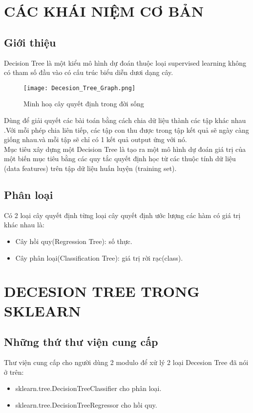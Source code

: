 \documentclass[12pt, a4paper]{article}
\begin{document}
\section{CÁC KHÁI NIỆM CƠ BẢN}
\subsection{Giới thiệu}
Decision Tree là một kiểu mô hình dự đoán thuộc loại supervised learning không có tham số đầu vào có cấu trúc biểu diễn dươi dạng cây.\\
\begin{wrapfigure}{l}[0pt]{0.625\linewidth}
    \texttt{[image: Decesion\_Tree\_Graph.png]}
    \caption{Minh hoạ cây quyết định trong đời sống}
\end{wrapfigure}
Dùng để giải quyết các bài toán bằng cách chia dữ liệu thành các tập khác nhau .Với mỗi phép chia liên tiếp, các tập con thu được trong tập kết quả sẽ ngày càng giống nhau.và mỗi tập sẽ chỉ có 1 kết quả output ứng với nó. \\


Mục tiêu xây dựng một Decision Tree là tạo ra một mô hình dự đoán giá trị của một biến mục tiêu bằng các quy tắc quyết định học từ các thuộc tính dữ liệu (data features) trên tập dữ liệu huấn luyện (training set). 
\subsection{Phân loại}
Có 2 loại cây quyết định từng loại cây quyết định ước lượng các hàm có giá trị khác nhau là:

\begin{itemize}
    \item Cây hồi quy(Regression Tree): số thực.
    \item Cây phân loại(Classification Tree): giá trị rời rạc(class). \\
\end{itemize}

\section{DECESION TREE TRONG SKLEARN}
\subsection{Những thứ thư viện cung cấp}
Thư viện cung cấp cho người dùng 2 modulo để xử lý 2 loại Decesion Tree đã nói ở trên:
\begin{itemize}
    \item sklearn.tree.DecisionTreeClassifier cho phân loại.
    \item sklearn.tree.DecisionTreeRegressor cho hồi quy.
\end{itemize}
\end{document}
